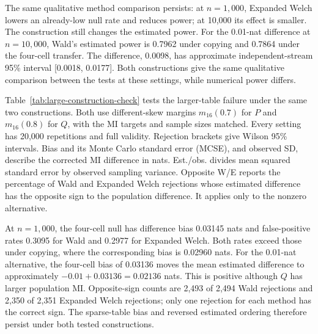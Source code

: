 \begin{table}[H]
\centering
\small
\caption{Rejection and difference bias under two population constructions.}
\label{tab:construction-check}

\end{table}

The same qualitative method comparison persists: at \(n=1{,}000\),
Expanded Welch lowers an already-low null rate and reduces power;
at 10,000 its effect is smaller. The construction still changes the
estimated power. For the 0.01-nat difference at \(n=10{,}000\),
Wald's estimated power is 0.7962 under copying and 0.7864 under the four-cell
transfer. The difference, 0.0098, has approximate independent-stream
95\% interval [0.0018, 0.0177]. Both constructions give the same
qualitative comparison between the tests at these settings, while
numerical power differs.

\medskip
{}

Table~\ref{tab:large-construction-check} tests the larger-table failure
under the same two constructions. Both use different-skew margins
\(m_{16}(0.7)\) for \(P\) and \(m_{16}(0.8)\) for \(Q\), with
the MI targets and sample sizes matched. Every setting has 20,000
repetitions and full validity. Rejection brackets give Wilson 95\%
intervals. Bias and its Monte Carlo standard error (MCSE), and observed
SD, describe the corrected MI difference in nats. Est./obs. divides
mean squared standard error by observed sampling variance.
Opposite W/E reports the percentage of Wald and Expanded Welch
rejections whose estimated difference has the opposite sign to the
population difference. It applies only to the nonzero alternative.

\begin{table}[H]
\centering
\small
\caption{Matched \(16\times16\) comparisons under two constructions.}
\label{tab:large-construction-check}
\setlength{\tabcolsep}{4.5pt}

\end{table}

At \(n=1{,}000\), the four-cell null has difference bias
0.03145 nats and false-positive rates 0.3095 for Wald and 0.2977 for
Expanded Welch. Both rates exceed those under copying, where the
corresponding bias is 0.02960 nats. For the 0.01-nat alternative,
the four-cell bias of 0.03136 moves the mean estimated difference to
approximately \(-0.01+0.03136=0.02136\) nats. This is positive
although \(Q\) has larger population MI. Opposite-sign counts are
2,493 of 2,494 Wald rejections and 2,350 of 2,351 Expanded Welch
rejections; only one rejection for each method has the correct sign.
The sparse-table bias and reversed estimated ordering therefore persist
under both tested constructions.

